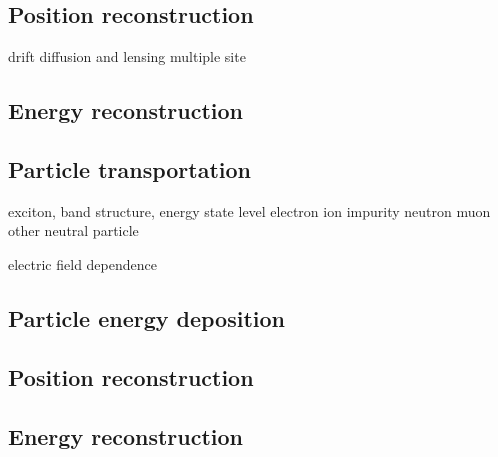 \subsection{Position reconstruction}
drift diffusion and lensing 
multiple site

\subsection{Energy reconstruction}

\subsection{Particle transportation}
exciton, band structure, energy state level 
electron
ion
impurity
neutron
muon
other neutral particle

electric field dependence
\subsection{Particle energy deposition}
\subsection{Position reconstruction}
\subsection{Energy reconstruction}

\
